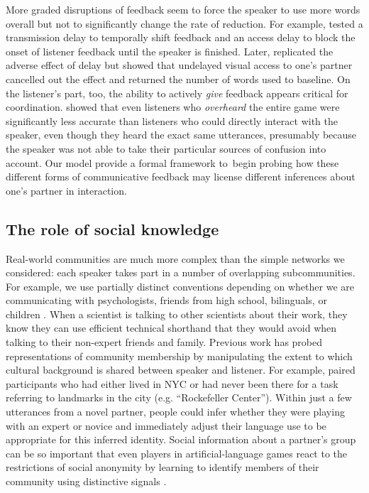 More graded disruptions of feedback seem to force the speaker to use more words overall but not to significantly change the rate of reduction. 
For example,  tested a transmission delay to temporally shift feedback and an access delay to block the onset of listener feedback until the speaker is finished. 
Later,  replicated the adverse effect of delay but showed that undelayed visual access to one's partner cancelled out the effect and returned the number of words used to baseline. 
On the listener's part, too, the ability to actively \emph{give} feedback appears critical for coordination. 
 showed that even listeners who \emph{overheard} the entire game were significantly less accurate than listeners who could directly interact with the speaker, even though they heard the exact same utterances, presumably because the speaker was not able to take their particular sources of confusion into account.
Our model provide a formal framework to begin probing how these different forms of communicative feedback may license different inferences about one's partner in interaction.

\subsection{The role of social knowledge}

Real-world communities are much more complex than the simple networks we considered: each speaker takes part in a number of overlapping subcommunities. 
For example, we use partially distinct conventions depending on whether we are communicating with psychologists, friends from high school, bilinguals, or children \cite{auer_code-switching_2013}.
When a scientist is talking to other scientists about their work, they know they can use efficient technical shorthand that they would avoid when talking to their non-expert friends and family. 
Previous work has probed representations of community membership by manipulating the extent to which cultural background is shared between speaker and listener.
For example,  paired participants who had either lived in NYC or had never been there for a task referring to landmarks in the city (e.g. ``Rockefeller Center''). 
Within just a few utterances from a novel partner, people could infer whether they were playing with an expert or novice and immediately adjust their language use to be appropriate for this inferred identity. 
Social information about a partner’s group can be so important that even players in artificial-language games react to the restrictions of social anonymity by learning to identify members of their community using distinctive signals \cite{roberts_experimental_2010}.


